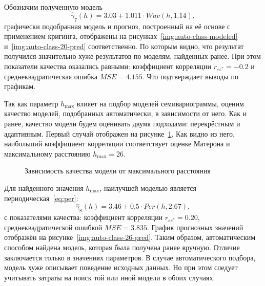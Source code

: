 Обозначим полученную модель
\begin{equation}
\label{eq:gamma7}
	\widehat{\gamma}_7(h) = 3.03 + 1.011 \cdot Wav(h, 1.14),
\end{equation}
графически подобранная модель и прогноз, построенный на её основе с применением кригинга, отображены на рисунках~\ref{img:auto-class-modeled} и~\ref{img:auto-class-20-pred} соответственно. По которым видно, что результат получился значительно хуже результатов по моделям, найденных ранее. При этом показатели качества оказались равными: коэффициент корреляции $ r_{\varepsilon\varepsilon^{*}} = -0.2 $ и среднеквадратическая ошибка $ MSE = 4.155 $. Что подтверждает выводы по графикам.

Так как параметр $ h_{\text{max}} $ влияет на подбор моделей семивариограммы, оценим качество моделей, подобранных автоматически, в зависимости от него. Как и ранее, качество модели будем оценивать двумя подходами: перекрёстным и адаптивным. Первый случай отображен на рисунке~\ref{img:auto-corr-cutoff}. Как видно из него, наибольший коэффициент корреляции соответствует оценке Матерона и максимальному расстоянию $ h_{\text{max}} = 26 $.
\begin{figure}[ht]
\caption{Зависимость качества модели от максимального расстояния}
\label{img:auto-corr-cutoff}
\end{figure}
Для найденного значения $ h_{\text{max}} $, наилучшей моделью является периодическая~\eqref{eq:per}:
\begin{equation*}
 	\widehat{\gamma}_8(h) = 3.46 + 0.5 \cdot Per(h, 2.67),
\end{equation*}
с показателями качества: коэффициент корреляции $ r_{\varepsilon\varepsilon^{*}} = 0.20 $, среднеквадратической ошибкой $ MSE = 3.835 $. График прогнозных значений отображён на рисунке~\ref{img:auto-class-26-pred}. Таким образом, автоматическим способом найдена модель, которая была получена ранее вручную. Отличие заключается только в значениях параметров. В случае автоматического подбора, модель хуже описывает поведение исходных данных. Но при этом следует учитывать затраты на поиск той или иной модели в обоих случаях.

